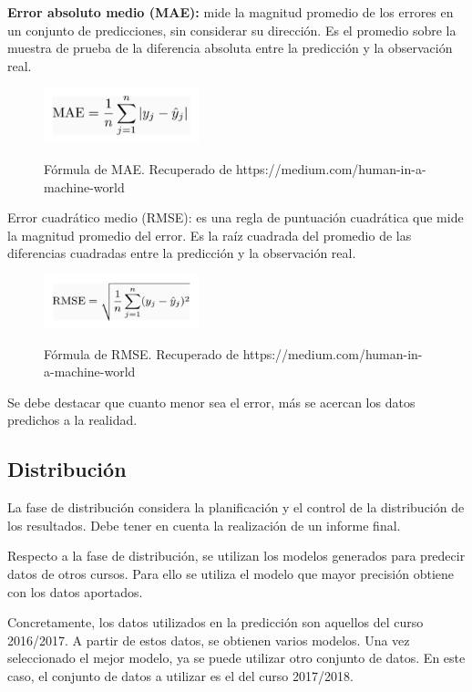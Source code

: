 \textbf{Error absoluto medio (MAE):} mide la magnitud promedio de los errores en un conjunto de predicciones, sin considerar su dirección. Es el promedio sobre la muestra de prueba de la diferencia absoluta entre la predicción y la observación real.
\begin{figure}[h]
	\centering
	\caption{Fórmula de MAE. Recuperado de https://medium.com/human-in-a-machine-world}
	\includegraphics[width=0.4\textwidth]{recursos/mae}
	\label{fig:MAE}
\end{figure}
\FloatBarrier
Error cuadrático medio (RMSE): es una regla de puntuación cuadrática que mide la magnitud promedio del error. Es la raíz cuadrada del promedio de las diferencias cuadradas entre la predicción y la observación real.
\begin{figure}[h]
	\centering
	\caption{Fórmula de RMSE. Recuperado de https://medium.com/human-in-a-machine-world}
	\includegraphics[width=0.4\textwidth]{recursos/rmse}
	\label{fig:MAE}
\end{figure}
\FloatBarrier

Se debe destacar que cuanto menor sea el error, más se acercan los datos predichos a la realidad.

\subsection{Distribución}
La fase de distribución considera la planificación y el control de la distribución de los resultados. Debe tener en cuenta la realización de un informe final.

Respecto a la fase de distribución, se utilizan los modelos generados para predecir datos de otros cursos. Para ello se utiliza el modelo que mayor precisión obtiene con los datos aportados.

Concretamente, los datos utilizados en la predicción son aquellos del curso 2016/2017. A partir de estos datos, se obtienen varios modelos. Una vez seleccionado el mejor modelo, ya se puede utilizar otro conjunto de datos. En este caso, el conjunto de datos a utilizar es el del curso 2017/2018.

